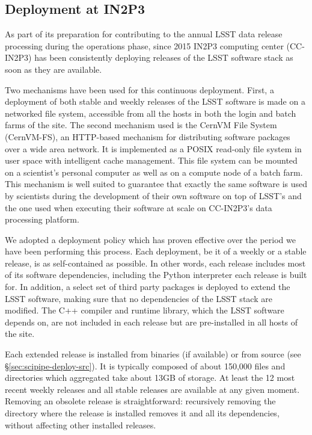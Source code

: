 \subsection{Deployment at IN2P3}

As part of its preparation for contributing to the annual LSST data release processing during the operations phase, since 2015 IN2P3 computing center (CC-IN2P3) has been consistently deploying releases of the LSST software stack as soon as they are available.

Two mechanisms have been used for this continuous deployment. First, a deployment of both stable and weekly releases of the LSST software is made on a networked file system, accessible from all the hosts in both the login and batch farms of the site. The second mechanism used is the CernVM File System (CernVM-FS)\cite{1742-6596-331-4-042003}, an HTTP-based mechanism for distributing software packages over a wide area network. It is implemented as a POSIX read-only file system in user space with intelligent cache management. This file system can be mounted on a scientist's personal computer as well as on a compute node of a batch farm. This mechanism is well suited to guarantee that exactly the same software is used by scientists during the development of their own software on top of LSST's and the one used when executing their software at scale on CC-IN2P3's data processing platform.

We adopted a deployment policy which has proven effective over the period we have been performing this process. Each deployment, be it of a weekly or a stable release, is as self-contained as possible. In other words, each release includes most of its software dependencies, including the Python interpreter each release is built for. In addition, a select set of third party packages is deployed to extend the LSST software, making sure that no dependencies of the LSST stack are modified. The C++ compiler and runtime library, which the LSST software depends on, are not included in each release but are pre-installed in all hosts of the site.

Each extended release is installed from binaries (if available) or from source (see \S\ref{sec:scipipe-deploy-src}). It is typically composed of about 150,000 files and directories which aggregated take about 13GB of storage. At least the 12 most recent weekly releases and all stable releases are available at any given moment. Removing an obsolete release is straightforward: recursively removing the directory where the release is installed removes it and all its dependencies, without affecting other installed releases.

